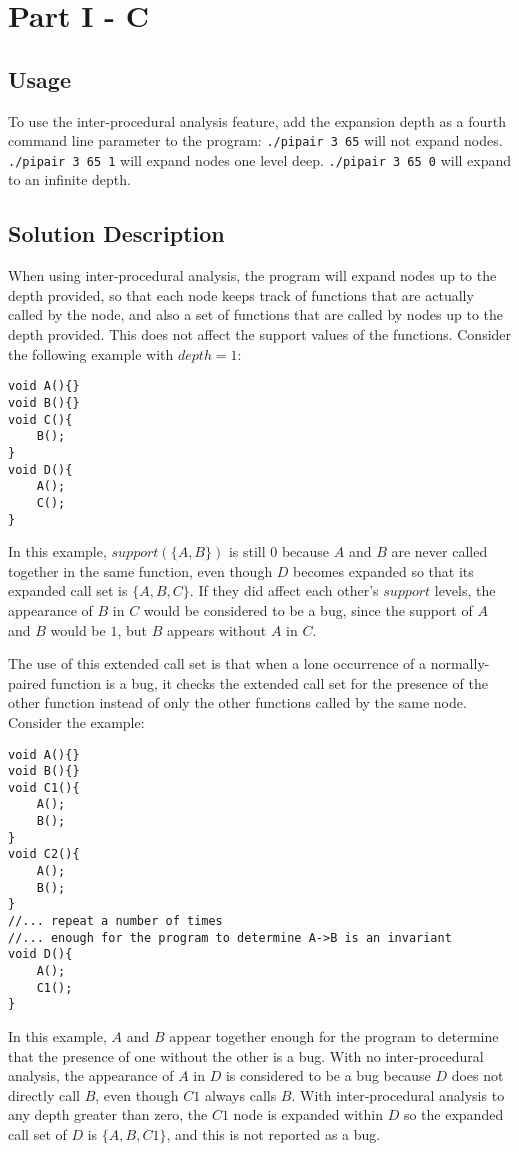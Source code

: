 \documentclass[12pt]{article}
\begin{document}
\section*{Part I - C}
\subsection*{Usage}
To use the inter-procedural analysis feature, add the expansion depth as a fourth command line parameter to the program: \texttt{./pipair 3 65} will not expand nodes. \texttt{./pipair 3 65 1} will expand nodes one level deep. \texttt{./pipair 3 65 0} will expand to an infinite depth.
\subsection*{Solution Description}
When using inter-procedural analysis, the program will expand nodes up to the depth provided, so that each node keeps track of functions that are actually called by the node, and also a set of functions that are called by nodes up to the depth provided. This does not affect the support values of the functions. Consider the following example with $depth=1$:
\begin{verbatim}
void A(){}
void B(){}
void C(){
	B();
}
void D(){
	A();
	C();
}
\end{verbatim}
In this example, $support(\{A,B\})$ is still $0$ because $A$ and $B$ are never called together in the same function, even though $D$ becomes expanded so that its expanded call set is $\{A,B,C\}$. If they did affect each other's $support$ levels, the appearance of $B$ in $C$ would be considered to be a bug, since the support of $A$ and $B$ would be $1$, but $B$ appears without $A$ in $C$.

\noindent The use of this extended call set is that when a lone occurrence of a normally-paired function is a bug, it checks the extended call set for the presence of the other function instead of only the other functions called by the same node. Consider the example:
\begin{verbatim}
void A(){}
void B(){}
void C1(){
	A();
	B();
}
void C2(){
	A();
	B();
}
//... repeat a number of times
//... enough for the program to determine A->B is an invariant
void D(){
	A();
	C1();
}
\end{verbatim}
In this example, $A$ and $B$ appear together enough for the program to determine that the presence of one without the other is a bug. With no inter-procedural analysis, the appearance of $A$ in $D$ is considered to be a bug because $D$ does not directly call $B$, even though $C1$ always calls $B$. With inter-procedural analysis to any depth greater than zero, the $C1$ node is expanded within $D$ so the expanded call set of $D$ is $\{A,B,C1\}$, and this is not reported as a bug.
\end{document}

